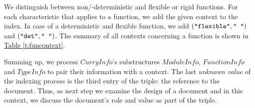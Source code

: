 \documentclass[%
	pdftex,%
	a4paper,%
	oneside,%
	chapterprefix,%
	headsepline,%
	12pt%
]{scrbook}
\newcommand{\Conid}[1]{\mathit{#1}}
\begin{document}
\begin{table}[h]
\caption{The contexts for a \ensuremath{\Conid{TypeInfo}} data structure}
\label{t:typcontext}
\end{table}

We distinguish between non/-deterministic and flexible or rigid
functions. %
For each characteristic that applies to a function, we add the given
context to the index. %
In case of a deterministic and flexible function, we
add \ensuremath{(\text{\tt \char34 flexible\char34},\text{\tt \char34 ~\char34})} and \ensuremath{(\text{\tt \char34 det\char34},\text{\tt \char34 ~\char34})}. %
The summary of all contexts concerning a function is shown in
\hyperref[t:funcontext]{Table \ref{t:funcontext}}.

\begin{table}[h]
\caption{The contexts for a \ensuremath{\Conid{FunctionInfo}} data structure}
\label{t:funcontext}
\end{table}

Summing up, we process \ensuremath{\Conid{CurryInfo}}'s substructures \ensuremath{\Conid{ModuleInfo}},
\ensuremath{\Conid{FunctionInfo}} and \ensuremath{\Conid{TypeInfo}} to pair their information with a
context. %
The last \emph{unknown value} of the indexing process is the third
entry of the triple: the reference to the document. %
Thus, as next step we examine the design of a document and in this
context, we discuss the document's role and value as part of the
triple.
\end{document}
